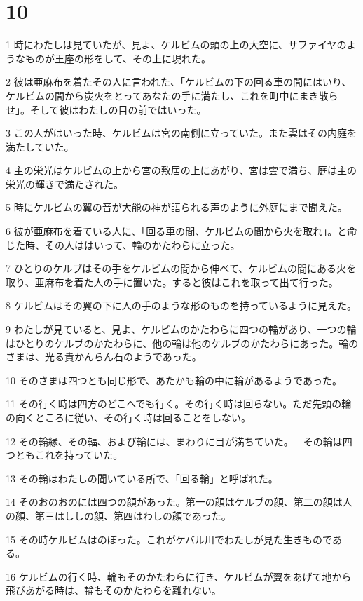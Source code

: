 \chapter{10}

\par 1 時にわたしは見ていたが、見よ、ケルビムの頭の上の大空に、サファイヤのようなものが王座の形をして、その上に現れた。
\par 2 彼は亜麻布を着たその人に言われた、「ケルビムの下の回る車の間にはいり、ケルビムの間から炭火をとってあなたの手に満たし、これを町中にまき散らせ」。そして彼はわたしの目の前ではいった。
\par 3 この人がはいった時、ケルビムは宮の南側に立っていた。また雲はその内庭を満たしていた。
\par 4 主の栄光はケルビムの上から宮の敷居の上にあがり、宮は雲で満ち、庭は主の栄光の輝きで満たされた。
\par 5 時にケルビムの翼の音が大能の神が語られる声のように外庭にまで聞えた。
\par 6 彼が亜麻布を着ている人に、「回る車の間、ケルビムの間から火を取れ」。と命じた時、その人ははいって、輪のかたわらに立った。
\par 7 ひとりのケルブはその手をケルビムの間から伸べて、ケルビムの間にある火を取り、亜麻布を着た人の手に置いた。すると彼はこれを取って出て行った。
\par 8 ケルビムはその翼の下に人の手のような形のものを持っているように見えた。
\par 9 わたしが見ていると、見よ、ケルビムのかたわらに四つの輪があり、一つの輪はひとりのケルブのかたわらに、他の輪は他のケルブのかたわらにあった。輪のさまは、光る貴かんらん石のようであった。
\par 10 そのさまは四つとも同じ形で、あたかも輪の中に輪があるようであった。
\par 11 その行く時は四方のどこへでも行く。その行く時は回らない。ただ先頭の輪の向くところに従い、その行く時は回ることをしない。
\par 12 その輪縁、その輻、および輪には、まわりに目が満ちていた。―その輪は四つともこれを持っていた。
\par 13 その輪はわたしの聞いている所で、「回る輪」と呼ばれた。
\par 14 そのおのおのには四つの顔があった。第一の顔はケルブの顔、第二の顔は人の顔、第三はししの顔、第四はわしの顔であった。
\par 15 その時ケルビムはのぼった。これがケバル川でわたしが見た生きものである。
\par 16 ケルビムの行く時、輪もそのかたわらに行き、ケルビムが翼をあげて地から飛びあがる時は、輪もそのかたわらを離れない。
